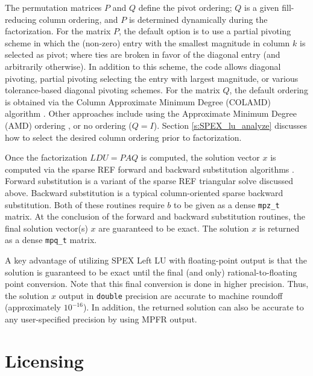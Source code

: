 \documentclass[12pt]{report}
\theoremstyle{definition}
\begin{document}
The permutation matrices $P$ and $Q$ define the pivot ordering; $Q$ is a given
fill-reducing column ordering, and $P$ is determined dynamically during the
factorization.  For the matrix $P$, the default option is to use a partial
pivoting scheme in which the (non-zero) entry with the smallest magnitude in column $k$ is selected as pivot; where ties are broken in favor of the diagonal entry (and arbitrarily otherwise). In addition to this scheme,
the code allows diagonal pivoting, partial pivoting selecting the entry with largest magnitude, or various tolerance-based diagonal pivoting schemes. For the matrix
$Q$, the default ordering is obtained via the Column Approximate Minimum Degree (COLAMD)
algorithm \cite{davis2004algorithmcolamd,davis2004column}. Other approaches
include using the Approximate Minimum Degree (AMD) ordering
\cite{amestoy1996approximate,amestoy2004algorithmamd}, or no ordering ($Q=I$). Section \ref{s:SPEX_lu_analyze} discusses how to select the desired column ordering prior to factorization.

Once the factorization $L D U = P A Q$ is computed, the solution vector 
$x$ is computed via the sparse REF forward and backward substitution algorithms \cite{lourenco2019exact}. 
Forward substitution is a variant of the sparse REF triangular solve discussed above. Backward substitution is a typical column-oriented sparse backward substitution. Both of these routines require $b$ to be given as a dense \verb|mpz_t| matrix. At the conclusion of the forward and 
backward substitution routines, the final solution vector(s) $x$ are guaranteed to be exact.  The solution $x$ is returned as a dense \verb|mpq_t| matrix.

A key advantage of utilizing SPEX Left LU with floating-point output is that the solution is guaranteed to be exact until the final (and only) rational-to-floating point conversion. Note that this final conversion is done in higher precision. Thus, the solution $x$ output in \verb|double| precision are accurate to machine roundoff (approximately $10^{-16}$). In addition, the returned solution can also be accurate to any user-specified precision by using MPFR output.

\section{Licensing} \label{s:LeftLU:licensing}
\end{document}
